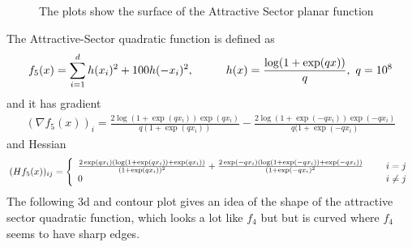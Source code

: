 \documentclass[a4paper]{article}
\begin{document}
\begin{figure}[h]
    \centering
    \qquad
    \caption{The plots show the surface of the Attractive Sector planar function}%
    \label{fig:4}%
\end{figure}
The Attractive-Sector quadratic function is defined as
\begin{align*}
  f_5(x) = \sum_{i=1}^d h(x_i)^2 + 100h(-x_i)^2, \hspace*{10mm} h(x) = \frac{\log(1+\exp(qx))}{q},\ q=10^8
\end{align*}
and it has gradient
\begin{align*}
  (\nabla f_5(x))_i = \frac{2\log(1+\exp(qx_i))\exp(qx_i)}{q(1+\exp(qx_i))}-\frac{2\log(1+\exp(-qx_i))\exp(-qx_i)}{q(1+\exp(-qx_i)}
\end{align*}
and Hessian
\begin{align*}
  (Hf_5(x))_{ij} = 
  \left\{
  \begin{array}{ll}
    \frac{2\exp(qx_i)(\log(1+\exp(qx_i))+\exp(qx_i))}{(1+\exp(qx_i))^2}+\frac{2\exp(-qx_i)(\log(1+\exp(-qx_i))+\exp(-qx_i))}{(1+\exp(-qx_i)^2}
    \hspace*{5mm}  & i=j\\
    0                                     & i\neq j
  \end{array}
  \right.
\end{align*}
The following 3d and contour plot gives an idea of the shape of the attractive sector quadratic function, which looks a lot like $f_4$ but but is curved where $f_4$ seems to have sharp edges. 
\end{document}
